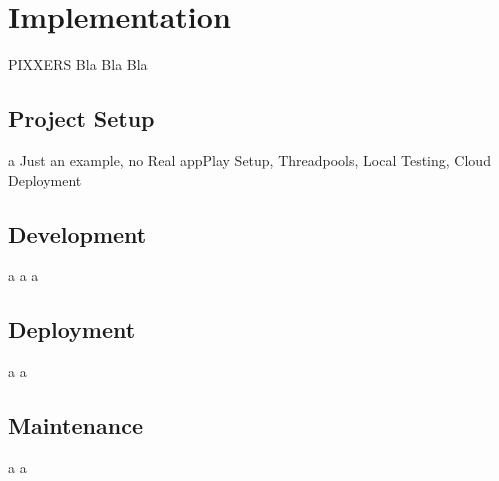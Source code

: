 \chapter{Implementation}
\label{sec:impl}
PIXXERS Bla Bla Bla

\section{Project Setup} \newpage a 
Just an example, no Real appPlay Setup, Threadpools, Local Testing, Cloud Deployment

\section{Development} \newpage a \newpage a \newpage a 

\section{Deployment} \newpage a \newpage a

\section{Maintenance} \newpage a \newpage a